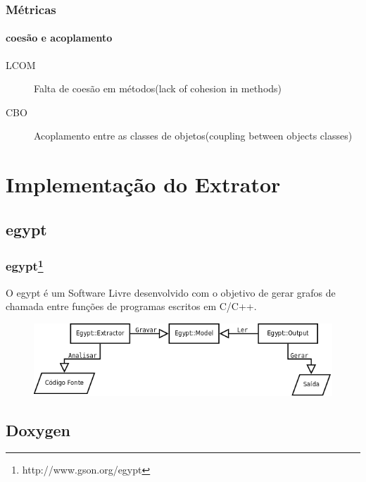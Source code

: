 \documentclass{beamer}
\begin{document}
\begin{frame}
\frametitle{Métricas}
\framesubtitle{coesão e acoplamento}
 \begin{description}
 \item[LCOM] Falta de coesão em métodos\newline (lack of cohesion in methods)
 \item[CBO] Acoplamento entre as classes de objetos\newline (coupling between objects classes)
 \end{description}
\end{frame}

\section{Implementação do Extrator}

\subsection{egypt}

\begin{frame}
\frametitle{egypt\footnote{http://www.gson.org/egypt}}
 O egypt é um Software Livre desenvolvido com o objetivo de gerar grafos de
 chamada entre funções de programas escritos em C/C++.
 \begin{figure}[h]
 \center
 \includegraphics[scale=0.3]{imagens/egypt-fluxogram}
 \label{fig:egypt-fluxogram}
 \end{figure}
\end{frame}

\subsection{Doxygen}
\end{document}
